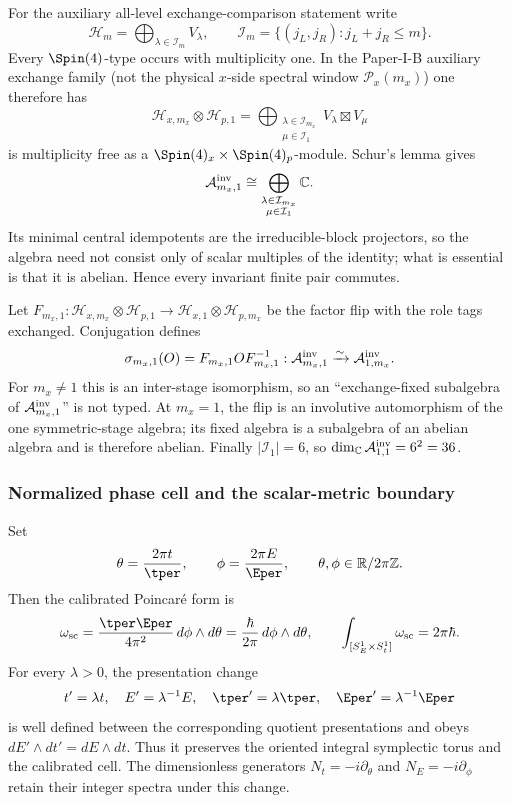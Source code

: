 \documentclass[11pt,a4paper]{article}
\begin{document}
For the auxiliary all-level exchange-comparison statement write
\[
 \mathcal H_m=\bigoplus_{\lambda\in\mathcal I_m}V_\lambda,
 \qquad
 \mathcal I_m=\{(j_L,j_R):j_L+j_R\le m\}.
\]
Every \(\Spin(4)\)-type occurs with multiplicity one.  In the
Paper-I-B auxiliary exchange family (not the physical \(x\)-side spectral
window \(\mathcal P_x(m_x)\)) one therefore has
\[
 \mathcal H_{x,m_x}\otimes\mathcal H_{p,1}
 =\bigoplus_{\substack{\lambda\in\mathcal I_{m_x}\\
                       \mu\in\mathcal I_1}}
   V_\lambda\boxtimes V_\mu
\]
is multiplicity free as a
\(\Spin(4)_x\times\Spin(4)_p\)-module.  Schur's lemma gives
\[
 \mathcal A^{\rm inv}_{m_x,1}
 \cong
 \bigoplus_{\substack{\lambda\in\mathcal I_{m_x}\\
                       \mu\in\mathcal I_1}}\mathbb C.
\]
Its minimal central idempotents are the irreducible-block projectors, so the
algebra need not consist only of scalar multiples of the identity; what is
essential is that it is abelian.  Hence every invariant finite pair commutes.

Let
\(F_{m_x,1}:\mathcal H_{x,m_x}\otimes\mathcal H_{p,1}
\to\mathcal H_{x,1}\otimes\mathcal H_{p,m_x}\)
be the factor flip with the role tags exchanged.  Conjugation defines
\[
 \sigma_{m_x,1}(O)=F_{m_x,1}OF_{m_x,1}^{-1}:
 \mathcal A^{\rm inv}_{m_x,1}\xrightarrow{\sim}
 \mathcal A^{\rm inv}_{1,m_x}.
\]
For \(m_x\ne1\) this is an inter-stage isomorphism, so an ``exchange-fixed
subalgebra of \(\mathcal A^{\rm inv}_{m_x,1}\)'' is not typed.  At
\(m_x=1\), the flip is an involutive automorphism of the one symmetric-stage
algebra; its fixed algebra is a subalgebra of an abelian algebra and is
therefore abelian.  Finally \(|\mathcal I_1|=6\), so
\(\dim_{\mathbb C}\mathcal A^{\rm inv}_{1,1}=6^2=36\).

\subsubsection{Normalized phase cell and the scalar-metric boundary}
\label{p3a:app:scalar-no-modulus-details}
Set
\[
 \theta=\frac{2\pi t}{\tper},
 \qquad
 \phi=\frac{2\pi E}{\Eper},
 \qquad
 \theta,\phi\in\mathbb R/2\pi\mathbb Z.
\]
Then the calibrated Poincar\'e form is
\[
 \omega_{\rm sc}
 =\frac{\tper\Eper}{4\pi^2}\,d\phi\wedge d\theta
 =\frac{\hbar}{2\pi}\,d\phi\wedge d\theta,
 \qquad
 \int_{[S_E^1\times S_t^1]}\omega_{\rm sc}=2\pi\hbar.
\]
For every \(\lambda>0\), the presentation change
\[
 t'=\lambda t,
 \quad E'=\lambda^{-1}E,
 \quad \tper'=\lambda\tper,
 \quad \Eper'=\lambda^{-1}\Eper
\]
is well defined between the corresponding quotient presentations and obeys
\(dE'\wedge dt'=dE\wedge dt\).  Thus it preserves the oriented integral
symplectic torus and the calibrated cell.  The dimensionless generators
\(N_t=-i\partial_\theta\) and \(N_E=-i\partial_\phi\) retain their integer
spectra under this change.
\end{document}
